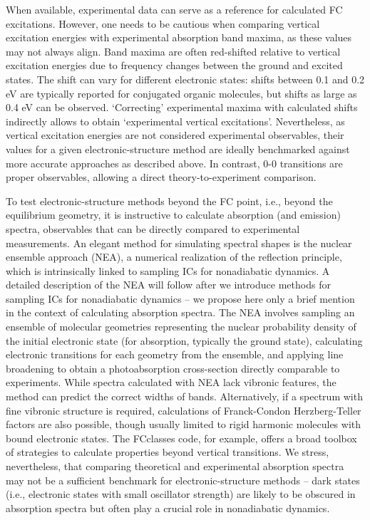 \documentclass[9pt,bestpractices,pubversion]{livecoms}
\begin{document}
When available, experimental data can serve as a reference for calculated FC excitations. However, one needs to be cautious when comparing vertical excitation energies with experimental absorption band maxima, as these values may not always align. Band maxima are often red-shifted relative to vertical excitation energies due to frequency changes between the ground and excited states.\cite{bai2020origin} The shift can vary for different electronic states: shifts between 0.1 and 0.2 eV are typically reported for conjugated organic molecules, but shifts as large as 0.4 eV can be observed.\cite{daday2012full} `Correcting' experimental maxima with calculated shifts indirectly allows to obtain `experimental vertical excitations'.\cite{crespo2014spectrum} Nevertheless, as vertical excitation energies are not considered experimental observables, their values for a given electronic-structure method are ideally benchmarked against more accurate approaches as described above. In contrast, 0-0 transitions are proper observables, allowing a direct theory-to-experiment comparison.\cite{jacquemin20150,winter2013benchmarks}

To test electronic-structure methods beyond the FC point, i.e., beyond the equilibrium geometry, it is instructive to calculate absorption (and emission) spectra, observables that can be directly compared to experimental measurements. An elegant method for simulating spectral shapes is the nuclear ensemble approach (NEA),\cite{crespo2014spectrum} a numerical realization of the reflection principle,\cite{schinkebook} which is intrinsically linked to sampling ICs for nonadiabatic dynamics. A detailed description of the NEA will follow after we introduce methods for sampling ICs for nonadiabatic dynamics -- we propose here only a brief mention in the context of calculating absorption spectra. The NEA involves sampling an ensemble of molecular geometries representing the nuclear probability density of the initial electronic state (for absorption, typically the ground state), calculating electronic transitions for each geometry from the ensemble, and applying line broadening to obtain a photoabsorption cross-section directly comparable to experiments. While spectra calculated with NEA lack vibronic features, the method can predict the correct widths of bands. Alternatively, if a spectrum with fine vibronic structure is required, calculations of Franck-Condon Herzberg-Teller factors are also possible, though usually limited to rigid harmonic molecules with bound electronic states.\cite{santoro2016beyondvert} The FCclasses code, for example, offers a broad toolbox of strategies to calculate properties beyond vertical transitions.\cite{cerezo2023fcclasses} We stress, nevertheless, that comparing theoretical and experimental absorption spectra may not be a sufficient benchmark for electronic-structure methods -- dark states (i.e., electronic states with small oscillator strength) are likely to be obscured in absorption spectra but often play a crucial role in nonadiabatic dynamics. 
\end{document}
